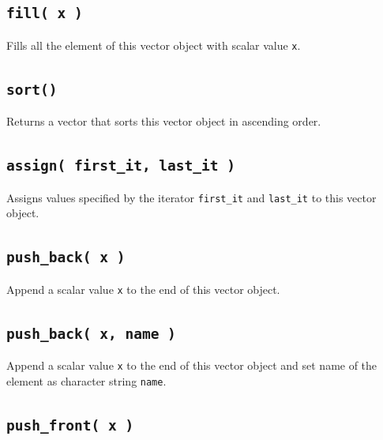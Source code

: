 \documentclass[]{book}
\begin{document}
\hypertarget{fill-x}{%
\subsection{\texorpdfstring{\texttt{fill(\ x\ )}}{fill( x )}}\label{fill-x}}

Fills all the element of this vector object with scalar value \texttt{x}.

\hypertarget{sort}{%
\subsection{\texorpdfstring{\texttt{sort()}}{sort()}}\label{sort}}

Returns a vector that sorts this vector object in ascending order.

\hypertarget{assign-first_it-last_it}{%
\subsection{\texorpdfstring{\texttt{assign(\ first\_it,\ last\_it\ )}}{assign( first\_it, last\_it )}}\label{assign-first_it-last_it}}

Assigns values specified by the iterator \texttt{first\_it} and \texttt{last\_it} to this vector object.

\hypertarget{push_back-x}{%
\subsection{\texorpdfstring{\texttt{push\_back(\ x\ )}}{push\_back( x )}}\label{push_back-x}}

Append a scalar value \texttt{x} to the end of this vector object.

\hypertarget{push_back-x-name}{%
\subsection{\texorpdfstring{\texttt{push\_back(\ x,\ name\ )}}{push\_back( x, name )}}\label{push_back-x-name}}

Append a scalar value \texttt{x} to the end of this vector object and set name of the element as character string \texttt{name}.

\hypertarget{push_front-x}{%
\subsection{\texorpdfstring{\texttt{push\_front(\ x\ )}}{push\_front( x )}}\label{push_front-x}}
\end{document}
